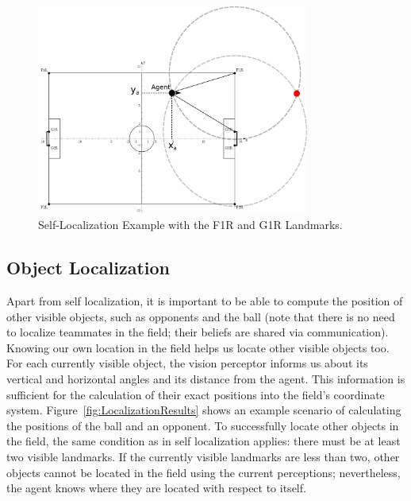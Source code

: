 \begin{figure}[t!]
\centering
  \includegraphics[width=0.8\textwidth]{Chapter3/figures/Localization.pdf}
  \caption{Self-Localization Example with the F1R and G1R Landmarks.} 
  \label{fig:Localization}
\end{figure}

\subsection{Object Localization} 

Apart from self localization, it is important to be able to compute the position of other visible objects, such as opponents and the ball (note that there is no need to localize teammates in the field; their beliefs are shared via communication). Knowing our own location in the field helps us locate other visible objects too. For each currently visible object, the vision perceptor informs us about its vertical and horizontal angles and its distance from the agent. This information is sufficient for the calculation of their exact positions into the field's coordinate system. Figure~\ref{fig:LocalizationResults} shows an example scenario of calculating the positions of the ball and an opponent. To successfully locate other objects in the field, the same condition as in self localization applies: there must be at least two visible landmarks. If the currently visible landmarks are less than two, other objects cannot be located in the field using the current perceptions; nevertheless, the agent knows where they are located with respect to itself. 



